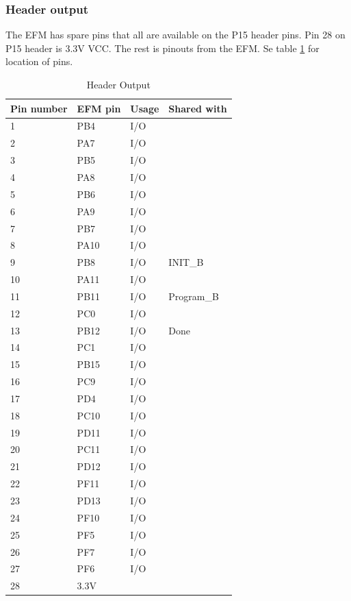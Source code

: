 \subsubsection{Header output}
The EFM has spare pins that all are available on the P15 header pins. Pin 28 on P15 header is 3.3V VCC. The rest is pinouts from the EFM. Se table \ref{tab:headerOut} for location of pins.
\begin{table}[]
    \centering
    \label{tab:headerOut}
    \begin{tabular}{llll}
        Pin number & EFM pin & Usage & Shared with \\
        \hline
        1       & PB4     & I/O   &             \\
        2       & PA7     & I/O   &             \\
        3       & PB5     & I/O   &             \\
        4       & PA8     & I/O   &             \\
        5       & PB6     & I/O   &             \\
        6       & PA9     & I/O   &             \\
        7       & PB7     & I/O   &             \\
        8       & PA10    & I/O   &             \\
        9       & PB8     & I/O   & INIT\_B     \\
        10      & PA11    & I/O   &             \\
        11      & PB11    & I/O   & Program\_B  \\
        12      & PC0     & I/O   &             \\
        13      & PB12    & I/O   & Done        \\
        14      & PC1     & I/O   &             \\
        15      & PB15    & I/O   &             \\
        16      & PC9     & I/O   &             \\
        17      & PD4     & I/O   &             \\
        18      & PC10    & I/O   &             \\
        19      & PD11    & I/O   &             \\
        20      & PC11    & I/O   &             \\
        21      & PD12    & I/O   &             \\
        22      & PF11    & I/O   &             \\
        23      & PD13    & I/O   &             \\
        24      & PF10    & I/O   &             \\
        25      & PF5     & I/O   &             \\
        26      & PF7     & I/O   &             \\
        27      & PF6     & I/O   &             \\
        28      & 3.3V    &       &
    \end{tabular}
    \caption{Header Output}
\end{table}

